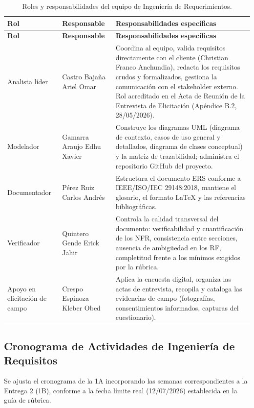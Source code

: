 \documentclass[11pt,a4paper]{article}
\begin{document}
\begin{longtable}{|p{4cm}|p{4cm}|p{7cm}|}
\caption{Roles y responsabilidades del equipo de Ingeniería de Requerimientos.}
\label{tab:roles-equipo} \\
\hline
\textbf{Rol} & \textbf{Responsable} & \textbf{Responsabilidades específicas} \\
\hline
\endfirsthead

\hline
\textbf{Rol} & \textbf{Responsable} & \textbf{Responsabilidades específicas} \\
\hline
\endhead

\hline
\endfoot

\hline
\endlastfoot

Analista líder & Castro Bajaña Ariel Omar & Coordina al equipo, valida requisitos directamente con el cliente (Christian Franco Anchundia), redacta los requisitos crudos y formalizados, gestiona la comunicación con el stakeholder externo. Rol acreditado en el Acta de Reunión de la Entrevista de Elicitación (Apéndice B.2, 28/05/2026). \\
\hline

Modelador & Gamarra Araujo Edhu Xavier & Construye los diagramas UML (diagrama de contexto, casos de uso general y detallados, diagrama de clases conceptual) y la matriz de trazabilidad; administra el repositorio GitHub del proyecto. \\
\hline

Documentador & Pérez Ruiz Carlos Andrés & Estructura el documento ERS conforme a IEEE/ISO/IEC 29148:2018, mantiene el glosario, el formato LaTeX y las referencias bibliográficas. \\
\hline

Verificador & Quintero Gende Erick Jahir & Controla la calidad transversal del documento: verificabilidad y cuantificación de los NFR, consistencia entre secciones, ausencia de ambigüedad en los RF, completitud frente a los mínimos exigidos por la rúbrica. \\
\hline

Apoyo en elicitación de campo & Crespo Espinoza Kleber Obed & Aplica la encuesta digital, organiza las actas de entrevista, recopila y cataloga las evidencias de campo (fotografías, consentimientos informados, capturas del cuestionario). \\
\hline

\end{longtable}

\subsection{Cronograma de Actividades de Ingeniería de Requisitos}
Se ajusta el cronograma de la 1A incorporando las semanas correspondientes a la Entrega 2 (1B), conforme a la fecha límite real (12/07/2026) establecida en la guía de rúbrica.
\end{document}
